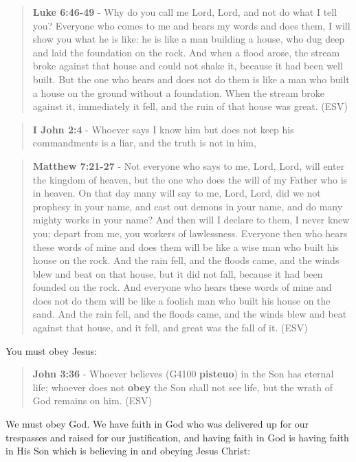 \documentclass[11pt]{article}
\begin{document}
\begin{quote}
\textbf{Luke 6:46-49} - Why do you call me Lord, Lord, and not do what I tell you? Everyone who comes to me and hears my words and does them, I will show you what he is like: he is like a man building a house, who dug deep and laid the foundation on the rock. And when a flood arose, the stream broke against that house and could not shake it, because it had been well built. But the one who hears and does not do them is like a man who built a house on the ground without a foundation. When the stream broke against it, immediately it fell, and the ruin of that house was great. (ESV)
\end{quote}

\begin{quote}
\textbf{I John 2:4} - Whoever says I know him but does not keep his commandments is a liar, and the truth is not in him,
\end{quote}

\begin{quote}
\textbf{Matthew 7:21-27} - Not everyone who says to me, Lord, Lord, will enter the kingdom of heaven, but the one who does the will of my Father who is in heaven.  On that day many will say to me, Lord, Lord, did we not prophesy in your name, and cast out demons in your name, and do many mighty works in your name?  And then will I declare to them, I never knew you; depart from me, you workers of lawlessness.  Everyone then who hears these words of mine and does them will be like a wise man who built his house on the rock.  And the rain fell, and the floods came, and the winds blew and beat on that house, but it did not fall, because it had been founded on the rock.  And everyone who hears these words of mine and does not do them will be like a foolish man who built his house on the sand.  And the rain fell, and the floods came, and the winds blew and beat against that house, and it fell, and great was the fall of it. (ESV)
\end{quote}

You must obey Jesus:

\begin{quote}
\textbf{John 3:36} - Whoever believes (G4100 \textbf{pisteuo}) in the Son has eternal life; whoever does not \textbf{obey} the Son shall not see life, but the wrath of God remains on him. (ESV)
\end{quote}

We must obey God. We have faith in God who was delivered up for our trespasses and raised for our justification, and having faith in God is having faith in His Son which is believing in and obeying Jesus Christ:
\end{document}
